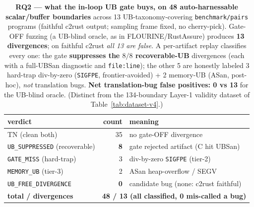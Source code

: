 \begin{table}[t]
  \centering
  \caption{\textbf{RQ2 --- what the in-loop UB gate buys, on 48 auto-harnessable
    scalar/buffer boundaries} across 13 UB-taxonomy-covering \texttt{benchmark/pairs}
    programs (faithful c2rust output; sampling frame fixed, no cherry-pick).
    Gate-OFF fuzzing (a UB-blind oracle, as in FLOURINE/RustAssure) produces
    \textbf{13 divergences}; on faithful c2rust \emph{all 13 are false}. A
    per-artifact replay classifies every one: the gate \textbf{suppresses the
    $8/8$ recoverable-UB} divergences (each with a full-UBSan diagnostic and
    \texttt{file:line}); the other 5 are honestly labeled 3 hard-trap div-by-zero
    (\texttt{SIGFPE}, frontier-avoided) + 2 memory-UB (ASan, post-hoc), \emph{not}
    translation bugs. \textbf{Net translation-bug false positives: 0 vs 13} for the
    UB-blind oracle. (Distinct from the 134-boundary Layer-1 validity dataset of
    Table~\ref{tab:dataset-v4}.)}
  \label{tab:rq2-tablea}
  \begin{tabular}{l r l}
    \toprule
    verdict & count & meaning \\
    \midrule
    TN (clean both)                       & 35 & no gate-OFF divergence \\
    \texttt{UB\_SUPPRESSED} (recoverable) & \textbf{8} & gate rejected artifact (C hit UBSan) \\
    \texttt{GATE\_MISS} (hard-trap)       & 3  & div-by-zero \texttt{SIGFPE} (tier-2) \\
    \texttt{MEMORY\_UB} (tier-3)          & 2  & ASan heap-overflow / SEGV \\
    \texttt{UB\_FREE\_DIVERGENCE}         & \textbf{0} & candidate bug (none: c2rust faithful) \\
    \midrule
    \textbf{total / divergences} & \multicolumn{2}{l}{\textbf{48 / 13 (all classified, 0 mis-called a bug)}} \\
    \bottomrule
  \end{tabular}
\end{table}

